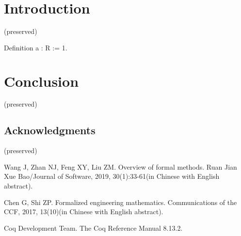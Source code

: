 \documentclass[runningheads]{llncs}
\begin{document}
\section{Introduction}\label{intro}
  (preserved)

\begin{coqJ}
  Definition a : R := 1.
\end{coqJ}
  

\section{Conclusion}\label{conclusion}
  (preserved)

\subsection*{Acknowledgments}
  (preserved)

%
%
%
% 
% 
%
\begin{thebibliography}{99}

Wang J, Zhan NJ, Feng XY, Liu ZM. Overview of formal methods. Ruan Jian Xue Bao/Journal of Software, 2019, 30(1):33-61(in Chinese with English abstract). 

Chen G, Shi ZP. Formalized engineering mathematics. Communications of the CCF, 2017, 13(10)(in Chinese with English abstract).

Coq Development Team. The Coq Reference Manual 8.13.2.

\end{thebibliography}
\end{document}
